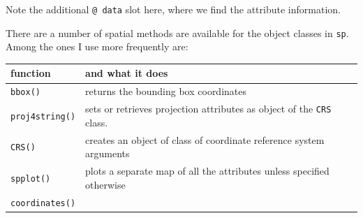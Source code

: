 \documentclass[]{book}
\begin{document}
Note the additional \texttt{@\ data} slot here, where we find the
attribute information.

There are a number of spatial methods are available for the object
classes in \texttt{sp}. Among the ones I use more frequently are:

\begin{longtable}[]{@{}ll@{}}
\toprule
\begin{minipage}[b]{0.17\columnwidth}\raggedright\strut
function\strut
\end{minipage} & \begin{minipage}[b]{0.72\columnwidth}\raggedright\strut
and what it does\strut
\end{minipage}\tabularnewline
\midrule
\endhead
\begin{minipage}[t]{0.17\columnwidth}\raggedright\strut
\texttt{bbox()}\strut
\end{minipage} & \begin{minipage}[t]{0.72\columnwidth}\raggedright\strut
returns the bounding box coordinates\strut
\end{minipage}\tabularnewline
\begin{minipage}[t]{0.17\columnwidth}\raggedright\strut
\texttt{proj4string()}\strut
\end{minipage} & \begin{minipage}[t]{0.72\columnwidth}\raggedright\strut
sets or retrieves projection attributes as object of the \texttt{CRS}
class.\strut
\end{minipage}\tabularnewline
\begin{minipage}[t]{0.17\columnwidth}\raggedright\strut
\texttt{CRS()}\strut
\end{minipage} & \begin{minipage}[t]{0.72\columnwidth}\raggedright\strut
creates an object of class of coordinate reference system
arguments\strut
\end{minipage}\tabularnewline
\begin{minipage}[t]{0.17\columnwidth}\raggedright\strut
\texttt{spplot()}\strut
\end{minipage} & \begin{minipage}[t]{0.72\columnwidth}\raggedright\strut
plots a separate map of all the attributes unless specified
otherwise\strut
\end{minipage}\tabularnewline
\begin{minipage}[t]{0.17\columnwidth}\raggedright\strut
\texttt{coordinates()}\strut
\end{minipage} & \begin{minipage}[t]{0.72\columnwidth}\raggedright\strut

\end{minipage}
\end{longtable}
\end{document}

